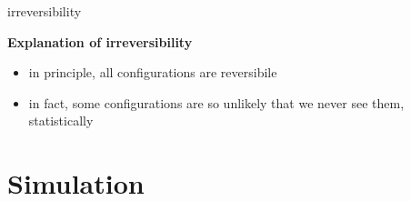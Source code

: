 \documentclass[usenames,dvipsnames]{beamer}
\begin{document}
  \begin{frame}{irreversibility}
    \begin{center}
      \Large \textbf{Explanation of irreversibility}
    \end{center}
    \begin{itemize}
      \item \alert{in principle}, all configurations are reversibile
      \item \alert{in fact}, some configurations are so unlikely that we never see them, statistically
    \end{itemize}
  \end{frame}

  \label{simulation}
  \section{Simulation}
\end{document}
